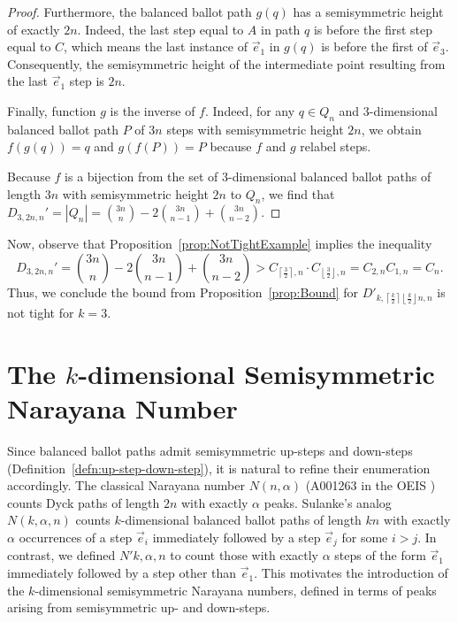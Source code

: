 \documentclass[11pt]{article}
\theoremstyle{remark}
\theoremstyle{definition}
\begin{document}
\begin{proof}
    Furthermore, the balanced ballot path $g(q)$ has a semisymmetric height of exactly $2n$. Indeed, the last step equal to $A$ in path $q$ is before the first step equal to $C$, which means the last instance of $\vec{e}_1$ in $g(q)$ is before the first of $\vec{e}_3$. Consequently, the semisymmetric height of the intermediate point resulting from the last $\vec{e}_1$ step is $2n$.

    Finally, function $g$ is the inverse of $f$. Indeed, for any $q \in Q_n$ and  3-dimensional balanced ballot path $P$ of $3n$ steps with semisymmetric height $2n$, we obtain $f(g(q)) = q$ and $g(f(P))= P$ because $f$ and $g$ relabel steps.

    Because $f$ is a bijection from the set of $3$-dimensional balanced ballot paths of length $3n$ with semisymmetric height $2n$ to $Q_n$, we find that $D_{3, 2n, n}' = |Q_n| = \binom{3n}{n} - 2\binom{3n}{n-1}+ \binom{3n}{n-2}$.
\end{proof}

Now, observe that Proposition~\ref{prop:NotTightExample} implies the inequality $$D_{3, 2n, n}' = \binom{3n}{n} - 2\binom{3n}{n-1}  + \binom{3n}{n-2} > C_{ \left\lceil \frac{3}{2} \right\rceil, n} \cdot C_{ \left\lfloor \frac{3}{2} \right\rfloor, n} = C_{2, n}C_{1, n} = C_n.$$  Thus, we conclude the bound from Proposition~\ref{prop:Bound} for $D'_{k, \left\lceil \frac{k}{2} \right\rceil \left\lfloor \frac{k}{2} \right\rfloor n, n}$ is not tight for $k=3$.


\section{The \texorpdfstring{$k$}{k}-dimensional Semisymmetric Narayana Number}\label{sec:Narayana}
Since balanced ballot paths admit semisymmetric up-steps and down-steps (Definition~\ref{defn:up-step-down-step}), it is natural to refine their enumeration accordingly. The classical Narayana number $N(n,\alpha)$ (A001263 in the OEIS \cite{oeis}) counts Dyck paths of length $2n$ with exactly $\alpha$ peaks. Sulanke’s analog $N(k,\alpha,n)$ \cite{multidimnarayana} counts $k$-dimensional balanced ballot paths of length $kn$ with exactly $\alpha$ occurrences of a step $\vec{e}_i$ immediately followed by a step $\vec{e} _ {j} $ for some $i>j$. In contrast, \cite{MR5034574} we defined $N'{k,\alpha,n}$ to count those with exactly $\alpha$ steps of the form $\vec{e}_1$ immediately followed by a step other than $\vec{e}_1$. This motivates the introduction of the $k$-dimensional semisymmetric Narayana numbers, defined in terms of peaks arising from semisymmetric up- and down-steps.
\end{document}
